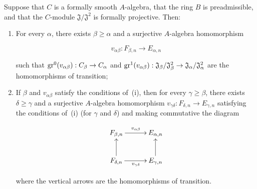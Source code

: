 \begin{lemma}[19.5.6.3]
\label{0.19.5.6.3}
Suppose that $C$ is a formally smooth $A$-algebra, that the ring $B$ is preadmissible, and that the $C$-module $\mathfrak{J}/\mathfrak{J}^2$ is formally projective.
Then:
\begin{enumerate}
  \item[\rm(i)] For every $\alpha$, there exists $\beta\geq\alpha$ and a surjective $A$-algebra homomorphism
  
\[
v_{\alpha\beta}:F_{\beta,n}\to E_{\alpha,n}
\]

  such that $\operatorname{gr}^0(v_{\alpha\beta}):C_\beta\to C_\alpha$ and $\operatorname{gr}^1(v_{\alpha\beta}):\mathfrak{J}_\beta/\mathfrak{J}_\beta^2\to\mathfrak{J}_\alpha/\mathfrak{J}_\alpha^2$ are the homomorphisms of transition;
  \item[\rm(ii)] If $\beta$ and $v_{\alpha\beta}$ satisfy the conditions of~{\rm(i)}, then for every $\gamma\geq\beta$, there exists $\delta\geq\gamma$ and a surjective $A$-algebra homomorphism $v_{\gamma\delta}:F_{\delta,n}\to E_{\gamma,n}$ satisfying the conditions of~{\rm(i)} (for $\gamma$ and $\delta$) and making commutative the diagram
  
\[
\xymatrix@C=3em{
      F_{\beta,n} \ar[r]^{v_{\alpha\beta}} & E_{\alpha,n} \\
      F_{\delta,n} \ar[u] \ar[r]_{v_{\gamma\delta}} & E_{\gamma,n} \ar[u]
    }
\]

  where the vertical arrows are the homomorphisms of transition.
\end{enumerate}
\end{lemma}

